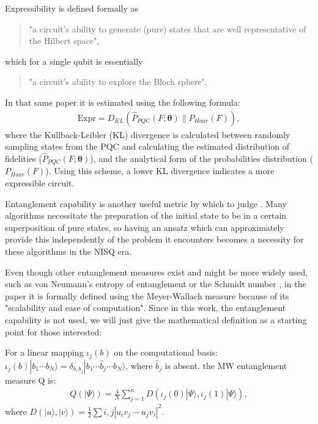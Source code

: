 Expressibility is defined formally as \cite{sim_expressibility_2019} \begin{quote} "a circuit's ability to generate (pure) states that are well representative of the Hilbert space",
\end{quote} which for a single qubit is essentially\begin{quote}"a circuit's ability to explore the Bloch sphere".
\end{quote}

In that same paper it is estimated using the following formula:
\begin{align}
    \text{Expr}=D_{KL}(\hat{P}_{PQC}(F;\boldsymbol{\theta})\parallel P_{Haar}(F)),
\end{align}
where the Kullback-Leibler (KL) \cite{belov_distributions_2011} divergence is calculated between randomly sampling states from the PQC and calculating the estimated distribution of fidelities ($\hat{P}_{PQC}(F;\boldsymbol{\theta})$), and the analytical form of the probabilities distribution ($P_{Haar}(F)$). Using this scheme, a lower KL divergence indicates a more expressible circuit.

Entanglement capability is another useful metric by which to judge \mya. Many algorithms necessitate the preparation of the initial state to be in a certain superposition of pure states, so having an ansatz which can approximately provide this independently of the problem it encounters becomes a necessity for these algorithms in the NISQ era.

Even though other entanglement measures exist and might be more widely used, such as von Neumann's entropy of entanglement \cite{boes_von_2019} or the Schmidt number \cite{terhal_schmidt_2000}, in the paper it is formally defined using the Meyer-Wallach measure \cite{meyer_global_2002} because of its "scalability and ease of computation". Since in this work, the entanglement capability is not used, we will just give the mathematical definition as a starting point for those interested:

For a linear mapping $\iota_j(b)$ on the computational basis: $\iota_j(b)|b_1\cdots b_N\rangle=\delta_{b,b_j}|b_1\cdots\hat{b}_j\cdots b_N\rangle$, where $\hat{b}_j$ is absent. the MW entanglement measure Q is:
\begin{align}
    Q(|\Psi\rangle)=\frac{4}{N}\sum_{j=1}^n D(\iota_j(0)|\Psi\rangle,\iota_j(1)|\Psi\rangle),
\end{align}
where $D(|u\rangle,|v\rangle)=\frac{1}{2}\sum{i,j}|u_i v_j-u_j v_i|^2$.

